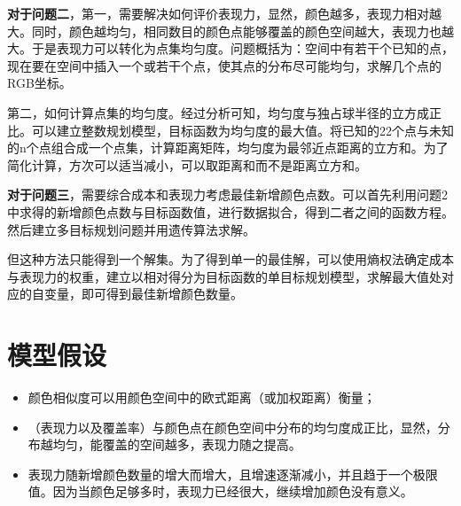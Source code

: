 \documentclass{article}
\begin{document}
	\textbf{对于问题二}，第一，需要解决如何评价表现力，显然，颜色越多，表现力相对越大。同时，颜色越均匀，相同数目的颜色点能够覆盖的颜色空间越大，表现力也越大。于是表现力可以转化为点集均匀度。问题概括为：空间中有若干个已知的点，现在要在空间中插入一个或若干个点，使其点的分布尽可能均匀，求解几个点的RGB坐标。
	
	第二，如何计算点集的均匀度。经过分析可知，均匀度与独占球半径的立方成正比。可以建立整数规划模型，目标函数为均匀度的最大值。将已知的22个点与未知的n个点组合成一个点集，计算距离矩阵，均匀度为最邻近点距离的立方和。为了简化计算，方次可以适当减小，可以取距离和而不是距离立方和。
	
	\textbf{对于问题三}，需要综合成本和表现力考虑最佳新增颜色点数。可以首先利用问题2中求得的新增颜色点数与目标函数值，进行数据拟合，得到二者之间的函数方程。然后建立多目标规划问题并用遗传算法求解。
	
	但这种方法只能得到一个解集。为了得到单一的最佳解，可以使用熵权法确定成本与表现力的权重，建立以相对得分为目标函数的单目标规划模型，求解最大值处对应的自变量，即可得到最佳新增颜色数量。
	
	
	
	
	
	\section{模型假设}
		\begin{itemize}
			\item 颜色相似度可以用颜色空间中的欧式距离（或加权距离）衡量；
			\item （表现力以及覆盖率）与颜色点在颜色空间中分布的均匀度成正比，显然，分布越均匀，能覆盖的空间越多，表现力随之提高。
			\item 表现力随新增颜色数量的增大而增大，且增速逐渐减小，并且趋于一个极限值。因为当颜色足够多时，表现力已经很大，继续增加颜色没有意义。
			
			
		\end{itemize}	
	
\end{document}
